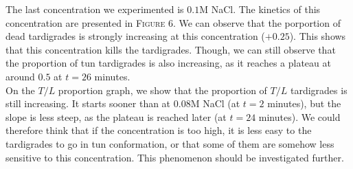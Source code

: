 \documentclass[12pt,a4paper, twocolumn]{article}
\begin{document}
The last concentration we experimented is $0.1$M NaCl.  The kinetics of this concentration are presented in \textsc{Figure} 6. We can observe that the porportion of dead tardigrades is strongly increasing at this concentration ($+0.25$). This shows that this concentration kills the tardigrades. Though, we can still observe that the proportion of tun tardigrades is also increasing, as it reaches a plateau at  around $0.5$ at $t=26$ minutes.\\
On the $T/L$ proportion graph, we show that the proportion of $T/L$ tardigrades is still increasing. It starts sooner than at $0.08$M NaCl (at $t=2$ minutes), but the slope is less steep, as the plateau is reached later (at $t=24$ minutes). We could therefore think that if the concentration is too high, it is less easy to the tardigrades to go in tun conformation, or that some of them are somehow less sensitive to this concentration. This phenomenon should be investigated further.
\end{document}
